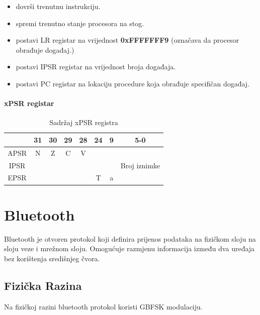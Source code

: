 \documentclass[times, utf8, diplomski]{diplomski}
\begin{document}
\begin{itemize}
  \item dovrši trenutnu instrukciju.
  \item spremi trenutno stanje procesora na stog.
  \item postavi LR registar na vrijednost \textbf{0xFFFFFFF9} (označava da procesor obrađuje događaj.)
  \item postavi IPSR registar na vrijednost broja događaja.
  \item postavi PC registar na lokaciju procedure koja obrađuje specifičan događaj.
\end{itemize}

\subsubsection{xPSR registar}

\begin{table}[H]
  \begin{center}
    \begin{tabular}{c|c|c|c|c||c||c||c|}
      \cline{2-8} & 31 & 30 & 29 & 28 & 24 & 9 & 5-0\\
      \hline
      \multicolumn{1}{|c|}{APSR} & N & Z & C & V & \multicolumn{3}{c|}{ } \\
      \hline
      \multicolumn{1}{|c|}{IPSR} & \multicolumn{6}{c||}{ } & Broj iznimke \\
      \hline
      \multicolumn{1}{|c|}{EPSR} & \multicolumn{4}{c||}{ } & T & a & \\
      \hline
    \end{tabular}
    \caption{Sadržaj xPSR registra}
  \end{center}
\end{table}

\newpage

\chapter{Bluetooth}

Bluetooth\cite{core41} je otvoren protokol koji definira prijenos podataka na fizičkom sloju na sloju veze i mrežnom sloju. Omogućuje razmjenu informacija između dva uređaja bez korištenja središnjeg čvora.

\section {Fizička Razina}
Na fizičkoj razini bluetooth protokol koristi GBFSK\cite{GBFSK} modulaciju.
\end{document}
